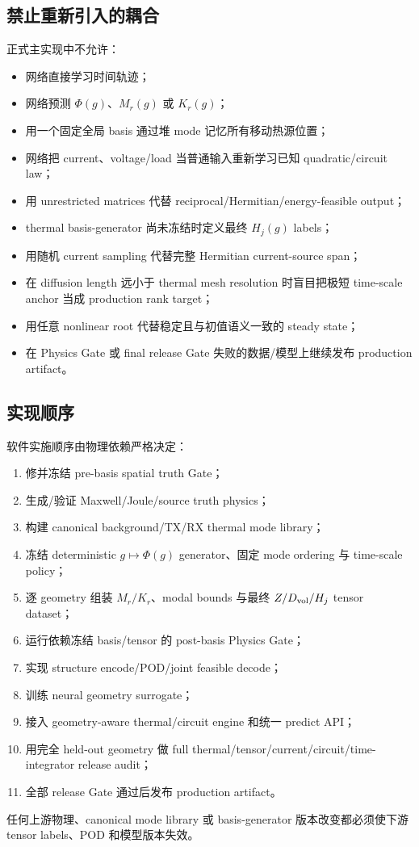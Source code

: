 \subsection{禁止重新引入的耦合}
正式主实现中不允许：
\begin{itemize}
  \item 网络直接学习时间轨迹；
  \item 网络预测 $\Phi(g)$、$M_r(g)$ 或 $K_r(g)$；
  \item 用一个固定全局 basis 通过堆 mode 记忆所有移动热源位置；
  \item 网络把 current、voltage/load 当普通输入重新学习已知 quadratic/circuit law；
  \item 用 unrestricted matrices 代替 reciprocal/Hermitian/energy-feasible output；
  \item thermal basis-generator 尚未冻结时定义最终 $H_j(g)$ labels；
  \item 用随机 current sampling 代替完整 Hermitian current-source span；
  \item 在 diffusion length 远小于 thermal mesh resolution 时盲目把极短 time-scale anchor 当成 production rank target；
  \item 用任意 nonlinear root 代替稳定且与初值语义一致的 steady state；
  \item 在 Physics Gate 或 final release Gate 失败的数据/模型上继续发布 production artifact。
\end{itemize}

\subsection{实现顺序}
软件实施顺序由物理依赖严格决定：
\begin{enumerate}
  \item 修并冻结 pre-basis spatial truth Gate；
  \item 生成/验证 Maxwell/Joule/source truth physics；
  \item 构建 canonical background/TX/RX thermal mode library；
  \item 冻结 deterministic $g\mapsto\Phi(g)$ generator、固定 mode ordering 与 time-scale policy；
  \item 逐 geometry 组装 $M_r/K_r$、modal bounds 与最终 $Z/D_{\rm vol}/H_j$ tensor dataset；
  \item 运行依赖冻结 basis/tensor 的 post-basis Physics Gate；
  \item 实现 structure encode/POD/joint feasible decode；
  \item 训练 neural geometry surrogate；
  \item 接入 geometry-aware thermal/circuit engine 和统一 predict API；
  \item 用完全 held-out geometry 做 full thermal/tensor/current/circuit/time-integrator release audit；
  \item 全部 release Gate 通过后发布 production artifact。
\end{enumerate}
任何上游物理、canonical mode library 或 basis-generator 版本改变都必须使下游 tensor labels、POD 和模型版本失效。
